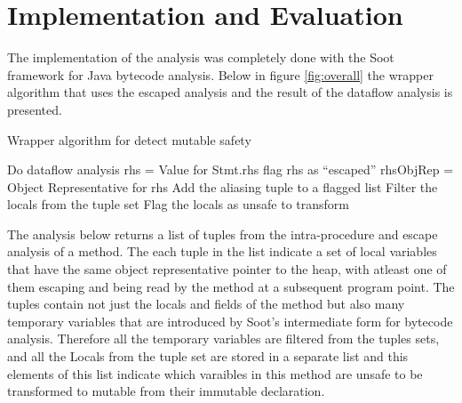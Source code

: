\section{Implementation and Evaluation}
The implementation of the analysis was completely done with the Soot framework\citep{ref:Soot} for Java bytecode analysis. Below in figure \ref{fig:overall} the wrapper algorithm that uses the escaped analysis and the result of the dataflow analysis is presented.

\begin{algorithm}
\caption{Wrapper algorithm for detect mutable safety}
\label{fig:overall}
\begin{algorithmic}
  \State Do dataflow analysis\;
       \State rhs = Value for Stmt.rhs
           \State flag rhs as ``escaped''
       \EndIf
       \State rhsObjRep = Object Representative for rhs
		      \State Add the aliasing tuple to a flagged list
       	  \EndIf
       \EndIf
  \EndFor
  \State Filter the locals from the tuple set
  \State Flag the locals as unsafe to transform
\end{algorithmic}
\end{algorithm}

The analysis below returns a list of tuples from the intra-procedure and escape analysis of a method. The each tuple in the list indicate a set of local variables that have the same object representative pointer to the heap, with atleast one of them escaping and being read by the method at a subsequent program point. The tuples contain not just the locals and fields of the method but also many temporary variables that are introduced by Soot's intermediate form for bytecode analysis. Therefore all the temporary variables are filtered from the tuples sets, and all the Locals from the tuple set are stored in a separate list and this elements of this list indicate which varaibles in this method are unsafe to be transformed to mutable from their immutable declaration.

